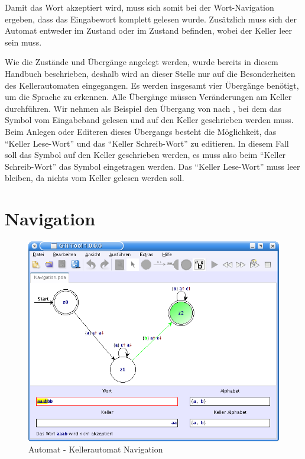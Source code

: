 Damit das Wort akzeptiert wird, muss sich somit bei der Wort-Navigation ergeben,
dass das Eingabewort komplett gelesen wurde. Zusätzlich muss sich der Automat
entweder im Zustand  oder im Zustand  befinden, wobei der
Keller leer sein muss.\vspace{10pt}

Wie die Zustände und Übergänge angelegt werden, wurde bereits in diesem Handbuch
beschrieben, deshalb wird an dieser Stelle nur auf die Besonderheiten des
Kellerautomaten eingegangen. Es werden insgesamt vier Übergänge benötigt, um die
Sprache zu erkennen. Alle Übergänge müssen Veränderungen am Keller durchführen.
Wir nehmen als Beispiel den Übergang von  nach , bei dem das
Symbol  vom Eingabeband gelesen und auf den Keller geschrieben werden
muss. Beim Anlegen oder Editeren dieses Übergangs besteht die Möglichkeit, das
"`Keller Lese-Wort"' und das "`Keller Schreib-Wort"' zu editieren. In diesem Fall
soll das Symbol  auf den Keller geschrieben werden, es muss also beim
"`Keller Schreib-Wort"' das Symbol  eingetragen werden. Das "`Keller
Lese-Wort"' muss leer bleiben, da nichts vom Keller gelesen werden
soll.\vspace{10pt}


\section{Navigation}

\begin{figure}[h]
\begin{center}
\includegraphics[width=12cm]{../images/pda_navigation.png}
\caption{Automat - Kellerautomat Navigation}
\end{center}
\end{figure}

